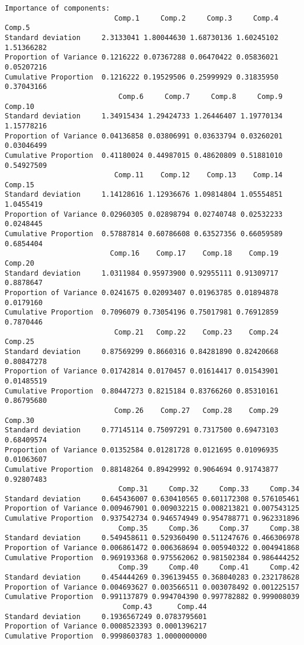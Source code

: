 \documentclass[a4paper]{article}
\begin{document}
\begin{lstlisting}[frame=single]
Importance of components:
                          Comp.1     Comp.2     Comp.3     Comp.4     Comp.5
Standard deviation     2.3133041 1.80044630 1.68730136 1.60245102 1.51366282
Proportion of Variance 0.1216222 0.07367288 0.06470422 0.05836021 0.05207216
Cumulative Proportion  0.1216222 0.19529506 0.25999929 0.31835950 0.37043166
                           Comp.6     Comp.7     Comp.8     Comp.9    Comp.10
Standard deviation     1.34915434 1.29424733 1.26446407 1.19770134 1.15778216
Proportion of Variance 0.04136858 0.03806991 0.03633794 0.03260201 0.03046499
Cumulative Proportion  0.41180024 0.44987015 0.48620809 0.51881010 0.54927509
                          Comp.11    Comp.12    Comp.13    Comp.14   Comp.15
Standard deviation     1.14128616 1.12936676 1.09814804 1.05554851 1.0455419
Proportion of Variance 0.02960305 0.02898794 0.02740748 0.02532233 0.0248445
Cumulative Proportion  0.57887814 0.60786608 0.63527356 0.66059589 0.6854404
                         Comp.16    Comp.17    Comp.18    Comp.19   Comp.20
Standard deviation     1.0311984 0.95973900 0.92955111 0.91309717 0.8878647
Proportion of Variance 0.0241675 0.02093407 0.01963785 0.01894878 0.0179160
Cumulative Proportion  0.7096079 0.73054196 0.75017981 0.76912859 0.7870446
                          Comp.21   Comp.22    Comp.23    Comp.24    Comp.25
Standard deviation     0.87569299 0.8660316 0.84281890 0.82420668 0.80847278
Proportion of Variance 0.01742814 0.0170457 0.01614417 0.01543901 0.01485519
Cumulative Proportion  0.80447273 0.8215184 0.83766260 0.85310161 0.86795680
                          Comp.26    Comp.27   Comp.28    Comp.29    Comp.30
Standard deviation     0.77145114 0.75097291 0.7317500 0.69473103 0.68409574
Proportion of Variance 0.01352584 0.01281728 0.0121695 0.01096935 0.01063607
Cumulative Proportion  0.88148264 0.89429992 0.9064694 0.91743877 0.92807483
                           Comp.31     Comp.32     Comp.33     Comp.34
Standard deviation     0.645436007 0.630410565 0.601172308 0.576105461
Proportion of Variance 0.009467901 0.009032215 0.008213821 0.007543125
Cumulative Proportion  0.937542734 0.946574949 0.954788771 0.962331896
                           Comp.35     Comp.36     Comp.37     Comp.38
Standard deviation     0.549458611 0.529360490 0.511247676 0.466306978
Proportion of Variance 0.006861472 0.006368694 0.005940322 0.004941868
Cumulative Proportion  0.969193368 0.975562062 0.981502384 0.986444252
                           Comp.39     Comp.40     Comp.41     Comp.42
Standard deviation     0.454444269 0.396139455 0.368040283 0.232178628
Proportion of Variance 0.004693627 0.003566511 0.003078492 0.001225157
Cumulative Proportion  0.991137879 0.994704390 0.997782882 0.999008039
                            Comp.43      Comp.44
Standard deviation     0.1936567249 0.0783795601
Proportion of Variance 0.0008523393 0.0001396217
Cumulative Proportion  0.9998603783 1.0000000000
\end{lstlisting}
\end{document}
